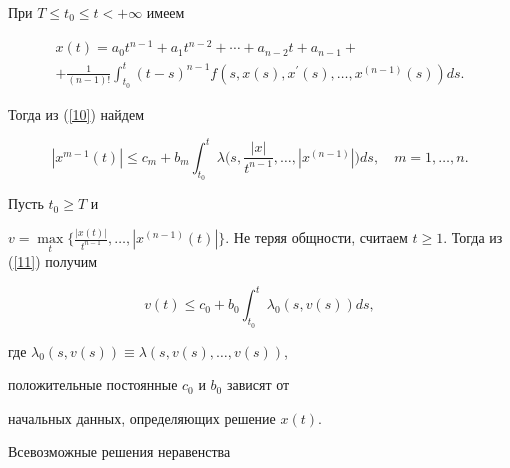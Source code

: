 \begin{pf}


При $T\leq t_{0} \leq t<+\infty$ имеем


\begin{multline}\label{10}


{x(t)=a_{0}t^{n-1}+a_{1}t^{n-2}+\dotsb+a_{n-2}t+a_{n-1}+} \\


%


+\frac{1}{(n-1)!}\int_{t_{0}}^{t}(t-s)^{n-1}


f(s,x(s),x^{\prime}(s),\dotsc,x^{(n-1)}(s))ds.


\end{multline}


Тогда из (\ref{10}) найдем


\begin{equation}


\label{11}


|x^{m-1}(t)|\leq c_{m}+b_{m}\int_{t_{0}}^{t}


\lambda\bigg(s,\frac{|x|}{t^{n-1}},\dotsc,|x^{(n-1)}|\bigg)ds,


\quad m=1,\dotsc,n.


\end{equation}





Пусть $t_{0}\geq T$ и


$v=\max\limits_{t}\lbrace\frac{|x(t)|} {t^{n-


1}},\dotsc,|x^{(n-1)}(t)|\rbrace$. Не теряя общности, считаем $t\geq


1$. Тогда из (\ref{11}) получим


\begin{equation}


\label{12}


v(t)\leq c_{0}+b_{0}\int_{t_{0}}^{t}


\lambda_{0}(s,v(s))ds,


\end{equation}


где $\lambda_{0}(s,v(s)) \equiv\lambda(s,v(s),\dotsc,v(s))$,


положительные постоянные $c_{0}$ и $b_{0}$ зависят от


начальных данных, определяющих решение $x(t)$.





Всевозможные решения неравенства


\begin{equation}



\end{equation}
\end{pf}
